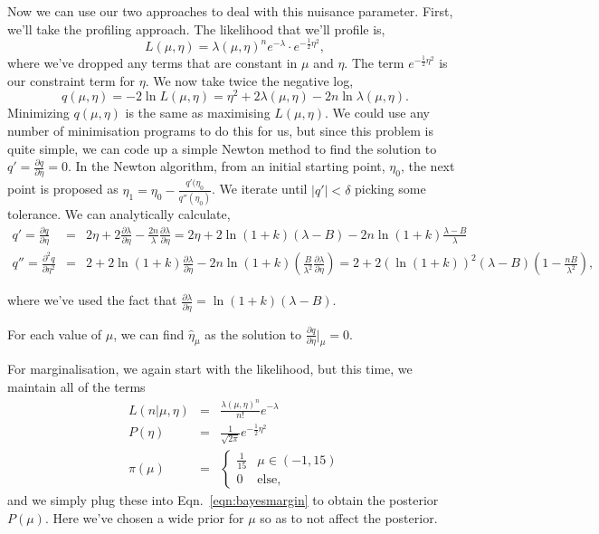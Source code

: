 Now we can use our two approaches to deal with this nuisance parameter. First, we'll take the profiling approach. The likelihood that we'll profile is,
\begin{equation}\label{eqn:lhcounting}
    L(\mu,\eta) = \lambda(\mu,\eta)^{n}e^{-\lambda}\cdot e^{-\frac{1}{2}\eta^{2}},
\end{equation}
where we've dropped any terms that are constant in $\mu$ and $\eta$. The term  $e^{-\frac{1}{2}\eta^{2}}$ is our constraint term for $\eta$. We now take twice the negative log,
\begin{equation}
    q(\mu,\eta) = -2\ln L(\mu,\eta) = \eta^{2}+2\lambda(\mu,\eta)-2n\ln\lambda(\mu,\eta).
\end{equation}
Minimizing $q(\mu,\eta)$ is the same as maximising $L(\mu,\eta)$. We could use any number of minimisation programs to do this for us, but since this problem is quite simple, we can code up a simple Newton method to find the solution to $q'=\frac{\partial q}{\partial \eta}=0$. In the Newton algorithm, from an initial starting point, $\eta_0$, the next point is proposed as $\eta_1=\eta_0-\frac{q'(\eta_{0}}{q''(\eta_0)}$. We iterate until $|q'|<\delta$ picking some tolerance. We can analytically calculate,
\begin{eqnarray}
    q'  =  \frac{\partial q}{\partial \eta} & = &   
    2\eta 
    +2\frac{\partial\lambda}{\partial \eta} 
    - \frac{2n}{\lambda}\frac{\partial\lambda}{\partial \eta} = 
    2\eta 
    + 2\ln(1+k) \left(\lambda-B\right)
    -2n\ln(1+k)\frac{\lambda - B}{\lambda}\\
    q''  =  \frac{\partial ^{2}q}{\partial \eta^{2}} 
    & = &   
    2 
    + 2\ln(1+k)\frac{\partial\lambda}{\partial \eta} 
    - 2n\ln(1+k)\left( \frac{B}{\lambda^{2}}\frac{\partial\lambda}{\partial \eta}  \right)
    = 
    2 
    + 2(\ln(1+k))^{2}\left(\lambda-B\right)\left( 1-\frac{nB}{\lambda^{2}}\right),
\end{eqnarray}

where we've used the fact that $\frac{\partial\lambda}{\partial \eta} =\ln(1+k)(\lambda-B)$.

For each value of $\mu$, we can find $\hat{\eta}_{\mu}$ as the solution to $\frac{\partial q}{\partial \eta}\biggr|_{\mu}=0$.

For marginalisation, we again start with the likelihood, but this time, we maintain all of the terms
\begin{eqnarray}
    L(n|\mu,\eta) & = & \frac{\lambda(\mu,\eta)^{n}}{n!}e^{-\lambda}\\
    P(\eta) & = & \frac{1}{\sqrt{2\pi}}e^{-\frac{1}{2}\eta^{2}}\\
    \pi(\mu) & = & \begin{cases}
                \frac{1}{15} & \mu \in (-1,15) \\
                0 & \mathrm{else,}
                \end{cases}
\end{eqnarray}
and we simply plug these into Eqn.~\ref{eqn:bayesmargin} to obtain the posterior $P(\mu)$. 
Here we've chosen a wide prior for $\mu$ so as to not affect the posterior.

